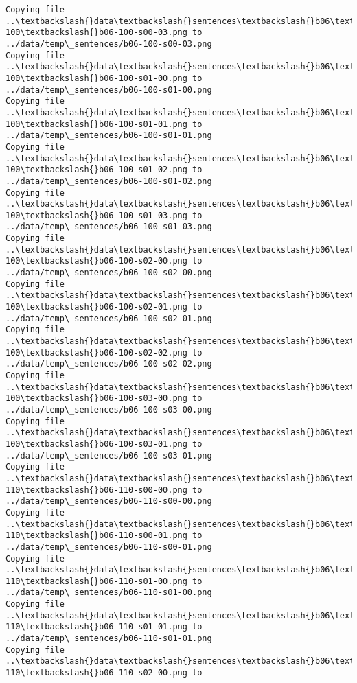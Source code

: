 \documentclass[11pt]{article}
\begin{document}
\begin{Verbatim}[commandchars=\\\{\}]
Copying file ..\textbackslash{}data\textbackslash{}sentences\textbackslash{}b06\textbackslash{}b06-100\textbackslash{}b06-100-s00-03.png to
../data/temp\_sentences/b06-100-s00-03.png
Copying file ..\textbackslash{}data\textbackslash{}sentences\textbackslash{}b06\textbackslash{}b06-100\textbackslash{}b06-100-s01-00.png to
../data/temp\_sentences/b06-100-s01-00.png
Copying file ..\textbackslash{}data\textbackslash{}sentences\textbackslash{}b06\textbackslash{}b06-100\textbackslash{}b06-100-s01-01.png to
../data/temp\_sentences/b06-100-s01-01.png
Copying file ..\textbackslash{}data\textbackslash{}sentences\textbackslash{}b06\textbackslash{}b06-100\textbackslash{}b06-100-s01-02.png to
../data/temp\_sentences/b06-100-s01-02.png
Copying file ..\textbackslash{}data\textbackslash{}sentences\textbackslash{}b06\textbackslash{}b06-100\textbackslash{}b06-100-s01-03.png to
../data/temp\_sentences/b06-100-s01-03.png
Copying file ..\textbackslash{}data\textbackslash{}sentences\textbackslash{}b06\textbackslash{}b06-100\textbackslash{}b06-100-s02-00.png to
../data/temp\_sentences/b06-100-s02-00.png
Copying file ..\textbackslash{}data\textbackslash{}sentences\textbackslash{}b06\textbackslash{}b06-100\textbackslash{}b06-100-s02-01.png to
../data/temp\_sentences/b06-100-s02-01.png
Copying file ..\textbackslash{}data\textbackslash{}sentences\textbackslash{}b06\textbackslash{}b06-100\textbackslash{}b06-100-s02-02.png to
../data/temp\_sentences/b06-100-s02-02.png
Copying file ..\textbackslash{}data\textbackslash{}sentences\textbackslash{}b06\textbackslash{}b06-100\textbackslash{}b06-100-s03-00.png to
../data/temp\_sentences/b06-100-s03-00.png
Copying file ..\textbackslash{}data\textbackslash{}sentences\textbackslash{}b06\textbackslash{}b06-100\textbackslash{}b06-100-s03-01.png to
../data/temp\_sentences/b06-100-s03-01.png
Copying file ..\textbackslash{}data\textbackslash{}sentences\textbackslash{}b06\textbackslash{}b06-110\textbackslash{}b06-110-s00-00.png to
../data/temp\_sentences/b06-110-s00-00.png
Copying file ..\textbackslash{}data\textbackslash{}sentences\textbackslash{}b06\textbackslash{}b06-110\textbackslash{}b06-110-s00-01.png to
../data/temp\_sentences/b06-110-s00-01.png
Copying file ..\textbackslash{}data\textbackslash{}sentences\textbackslash{}b06\textbackslash{}b06-110\textbackslash{}b06-110-s01-00.png to
../data/temp\_sentences/b06-110-s01-00.png
Copying file ..\textbackslash{}data\textbackslash{}sentences\textbackslash{}b06\textbackslash{}b06-110\textbackslash{}b06-110-s01-01.png to
../data/temp\_sentences/b06-110-s01-01.png
Copying file ..\textbackslash{}data\textbackslash{}sentences\textbackslash{}b06\textbackslash{}b06-110\textbackslash{}b06-110-s02-00.png to

\end{Verbatim}
\end{document}

